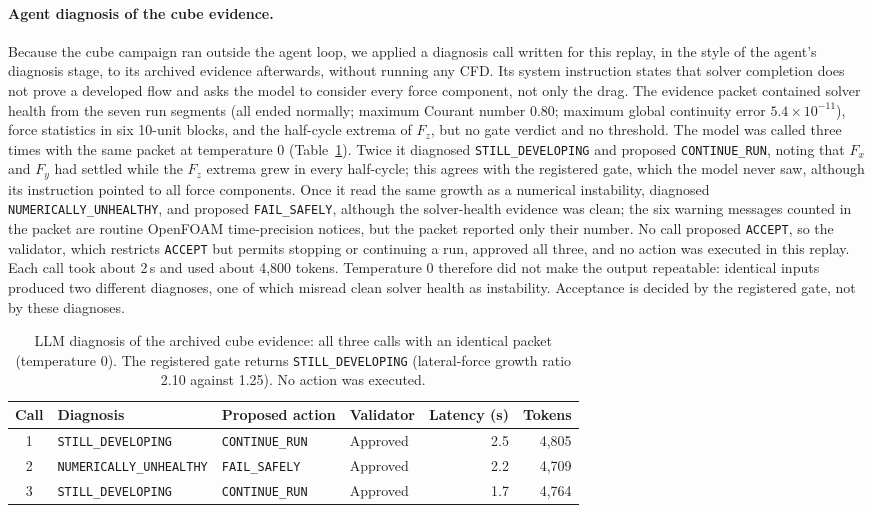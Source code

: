 \documentclass[11pt]{article}
\begin{document}
\paragraph{Agent diagnosis of the cube evidence.} Because the cube campaign
ran outside the agent loop, we applied a diagnosis call written for this
replay, in the style of the agent's diagnosis stage, to its archived evidence
afterwards, without running any CFD. Its system instruction states that solver
completion does not prove a developed flow and asks the model to consider every
force component, not only the drag. The evidence packet
contained solver health from the seven run segments (all ended normally;
maximum Courant number 0.80; maximum global continuity error
$5.4\times10^{-11}$), force statistics in six 10-unit blocks, and the
half-cycle extrema of $F_z$, but no gate verdict and no threshold. The model
was called three times with the same packet at temperature 0
(Table~\ref{tab:cube_llm}). Twice it diagnosed \texttt{STILL\_DEVELOPING} and
proposed \texttt{CONTINUE\_RUN}, noting that $F_x$ and $F_y$ had settled while
the $F_z$ extrema grew in every half-cycle; this agrees with the registered
gate, which the model never saw, although its instruction pointed to all force
components. Once it read the same growth as a numerical
instability, diagnosed \texttt{NUMERICALLY\_UNHEALTHY}, and proposed
\texttt{FAIL\_SAFELY}, although the solver-health evidence was clean; the six
warning messages counted in the packet are routine OpenFOAM time-precision
notices, but the packet reported only their number. No call proposed
\texttt{ACCEPT}, so the validator, which restricts \texttt{ACCEPT} but permits
stopping or continuing a run, approved all three, and no action was executed
in this replay. Each call took about 2\,s and used about 4,800 tokens.
Temperature 0 therefore did not make the output repeatable: identical inputs
produced two different diagnoses, one of which misread clean solver health as
instability. Acceptance is decided by the registered gate, not by these
diagnoses.

\begin{table}[!htbp]
\centering
\caption{LLM diagnosis of the archived cube evidence: all three calls with
an identical packet (temperature 0). The registered gate returns
\texttt{STILL\_DEVELOPING} (lateral-force growth ratio 2.10 against 1.25).
No action was executed.}
\label{tab:cube_llm}
\footnotesize
\begin{tabular}{@{}clllrr@{}}
\toprule
Call & Diagnosis & Proposed action & Validator & Latency (s) & Tokens \\
\midrule
1 & \texttt{STILL\_DEVELOPING} & \texttt{CONTINUE\_RUN} & Approved & 2.5 & 4,805 \\
2 & \texttt{NUMERICALLY\_UNHEALTHY} & \texttt{FAIL\_SAFELY} & Approved & 2.2 & 4,709 \\
3 & \texttt{STILL\_DEVELOPING} & \texttt{CONTINUE\_RUN} & Approved & 1.7 & 4,764 \\
\bottomrule
\end{tabular}
\end{table}
\end{document}
